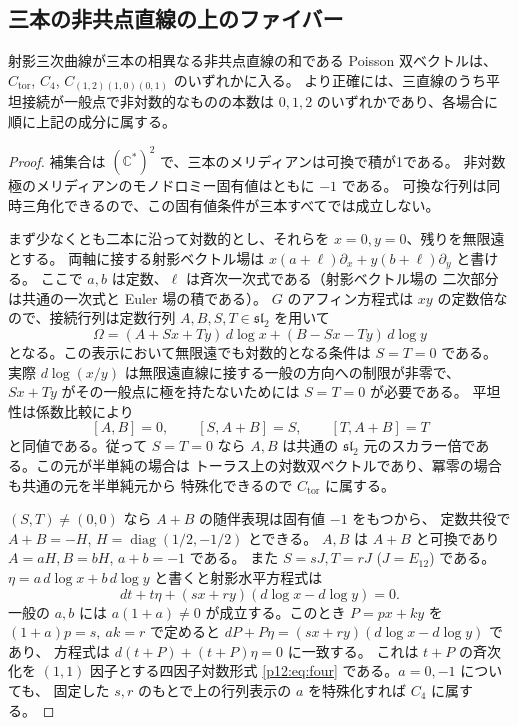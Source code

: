 \subsection{三本の非共点直線の上のファイバー}\label{p12:sec:triangle}
\begin{theorem}\label{p12:th:triangle}
射影三次曲線が三本の相異なる非共点直線の和である Poisson 双ベクトルは、
$C_{\mathrm{tor}}$, $C_4$, $C_{(1,2)(1,0)(0,1)}$ のいずれかに入る。
より正確には、三直線のうち平坦接続が一般点で非対数的なものの本数は
$0,1,2$ のいずれかであり、各場合に順に上記の成分に属する。
\end{theorem}
\begin{proof}
補集合は $(\mathbb C^*)^2$ で、三本のメリディアンは可換で積が1である。
非対数極のメリディアンのモノドロミー固有値はともに $-1$ である。
可換な行列は同時三角化できるので、この固有値条件が三本すべてでは成立しない。

まず少なくとも二本に沿って対数的とし、それらを $x=0,y=0$、残りを無限遠とする。
両軸に接する射影ベクトル場は
$x(a+\ell)\partial_x+y(b+\ell)\partial_y$ と書ける。
ここで $a,b$ は定数、$\ell$ は斉次一次式である（射影ベクトル場の
二次部分は共通の一次式と Euler 場の積である）。
$G$ のアフィン方程式は $xy$ の定数倍なので、接続行列は定数行列
$A,B,S,T\in\mathfrak{sl}_2$ を用いて
\[
 \Omega=(A+Sx+Ty)\,d\log x+(B-Sx-Ty)\,d\log y
\]
となる。この表示において無限遠でも対数的となる条件は $S=T=0$ である。
実際 $d\log(x/y)$ は無限遠直線に接する一般の方向への制限が非零で、
$Sx+Ty$ がその一般点に極を持たないためには $S=T=0$ が必要である。
平坦性は係数比較により
\[
 [A,B]=0,\qquad [S,A+B]=S,\qquad [T,A+B]=T
\]
と同値である。従って $S=T=0$ なら $A,B$ は共通の
$\mathfrak{sl}_2$ 元のスカラー倍である。この元が半単純の場合は
トーラス上の対数双ベクトルであり、冪零の場合も共通の元を半単純元から
特殊化できるので $C_{\mathrm{tor}}$ に属する。

$(S,T)\ne(0,0)$ なら $A+B$ の随伴表現は固有値 $-1$ をもつから、
定数共役で $A+B=-H$, $H=\operatorname{diag}(1/2,-1/2)$ とできる。
$A,B$ は $A+B$ と可換であり $A=aH,B=bH$, $a+b=-1$ である。
また $S=sJ,T=rJ$ ($J=E_{12}$) である。$\eta=a\,d\log x+b\,d\log y$
と書くと射影水平方程式は
\[
 dt+t\eta+(sx+ry)(d\log x-d\log y)=0 .
\]
一般の $a,b$ には $a(1+a)\ne0$ が成立する。このとき
$P=p x+k y$ を $(1+a)p=s,\ ak=r$ で定めると
$dP+P\eta=(sx+ry)(d\log x-d\log y)$ であり、
方程式は $d(t+P)+(t+P)\eta=0$ に一致する。
これは $t+P$ の斉次化を $(1,1)$ 因子とする四因子対数形式
\eqref{p12:eq:four} である。$a=0,-1$ についても、
固定した $s,r$ のもとで上の行列表示の $a$ を特殊化すれば $C_4$ に属する。


\end{proof}
